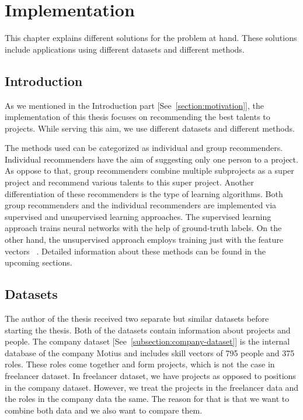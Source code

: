 
\chapter{Implementation}\label{chapter:implementation}

This chapter explains different solutions for the problem at hand. These solutions include applications using different datasets and different methods.

\section{Introduction}

As we mentioned in the Introduction part [See~\autoref{section:motivation}], the implementation of this thesis focuses on recommending the best talents to projects. While serving this aim, we use different datasets and different methods. 


The methods used can be categorized as individual and group recommenders. Individual recommenders have the aim of suggesting only one person to a project. As oppose to that, group recommenders combine multiple subprojects as a super project and recommend various talents to this super project. Another differentiation of these recommenders is the type of learning algorithms. Both group recommenders and the individual recommenders are implemented via supervised and unsupervised learning approaches. The supervised learning approach trains neural networks with the help of ground-truth labels. On the other hand, the unsupervised approach employs training just with the feature vectors ~\parencite{sathya2013comparison}. Detailed information about these methods can be found in the upcoming sections. 

\section{Datasets}\label{section:datasets}

The author of the thesis received two separate but similar datasets before starting the thesis. Both of the datasets contain information about projects and people. The company dataset [See~\autoref{subsection:company-dataset}] is the internal database of the company Motius and includes skill vectors of 795 people and 375 roles. These roles come together and form projects, which is not the case in freelancer dataset. In freelancer dataset, we have projects as opposed to positions in the company dataset. However, we treat the projects in the freelancer data and the roles in the company data the same. The reason for that is that we want to combine both data and we also want to compare them.



